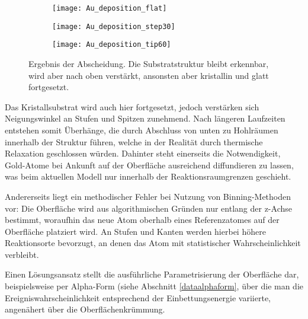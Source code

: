 \begin{figure}[bt]
  \captionsetup[subfigure]{singlelinecheck=false}
  \def\subfigwidth{0.31\textwidth}
  \begin{subfigure}[t]{\subfigwidth}
    \texttt{[image: Au\_deposition\_flat]}
    \label{fig:golddepositions-a}
  \end{subfigure}
  \hfill
  \begin{subfigure}[t]{\subfigwidth}
    \texttt{[image: Au\_deposition\_step30]}
    \label{fig:golddepositions-b}
  \end{subfigure}
  \hfill
  \begin{subfigure}[t]{\subfigwidth}
    \texttt{[image: Au\_deposition\_tip60]}
    \label{fig:golddepositions-c}
  \end{subfigure}
  \caption[Abscheidung auf strukturierten Substraten]{
    Ergebnis der Abscheidung.
    Die Substratstruktur bleibt erkennbar, wird aber nach oben verstärkt, ansonsten aber kristallin und glatt fortgesetzt.
  }
  \label{fig:golddepositions}
\end{figure}

Das Kristallsubstrat wird auch hier fortgesetzt, jedoch verstärken sich Neigungswinkel an Stufen und Spitzen zunehmend.
Nach längeren Laufzeiten entstehen somit Überhänge, die durch Abschluss von unten zu Hohlräumen innerhalb der Struktur führen, welche in der Realität durch thermische Relaxation geschlossen würden.
Dahinter steht einerseits die Notwendigkeit, Gold-Atome bei Ankunft auf der Oberfläche ausreichend diffundieren zu lassen, was beim aktuellen Modell nur innerhalb der Reaktionsraumgrenzen geschieht.

Andererseits liegt ein methodischer Fehler bei Nutzung von Binning-Methoden vor:
Die Oberfläche wird aus algorithmischen Gründen nur entlang der z-Achse bestimmt, woraufhin das neue Atom oberhalb eines Referenzatomes auf der Oberfläche platziert wird.
An Stufen und Kanten werden hierbei höhere Reaktionsorte bevorzugt, an denen das Atom mit statistischer Wahrscheinlichkeit verbleibt.

Einen Lösungsansatz stellt die ausführliche Parametrisierung der Oberfläche dar, beispielsweise per Alpha-Form (siehe Abschnitt \ref{dataalphaform}, über die man die Ereigniswahrscheinlichkeit entsprechend der Einbettungsenergie variierte, angenähert über die Oberflächenkrümmung.
